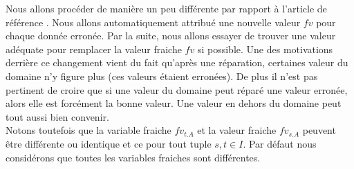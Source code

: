 \documentclass[letterpaper, 12pt]{report}
\theoremstyle{definition}
\begin{document}
Nous allons procéder de manière un peu différente par rapport à l'article de référence \cite{main}. Nous allons automatiquement attribué une nouvelle valeur $fv$ pour chaque donnée erronée. Par la suite, nous allons essayer de trouver une valeur adéquate pour remplacer la valeur fraiche $fv$ si possible. Une des motivations derrière ce changement vient du fait qu'après une réparation, certaines valeur du domaine n'y figure plus (ces valeurs étaient erronées). De plus il n'est pas pertinent de croire que si une valeur du domaine peut réparé une valeur erronée, alors elle est forcément la bonne valeur. Une valeur en dehors du domaine peut tout aussi bien convenir.\\

Notons toutefois que la variable fraiche $fv_{t.A}$ et la valeur fraiche $fv_{s.A}$ peuvent être différente ou identique et ce pour tout tuple $s,t \in I$. Par défaut nous considérons que toutes les variables fraiches sont différentes.\\
\end{document}
